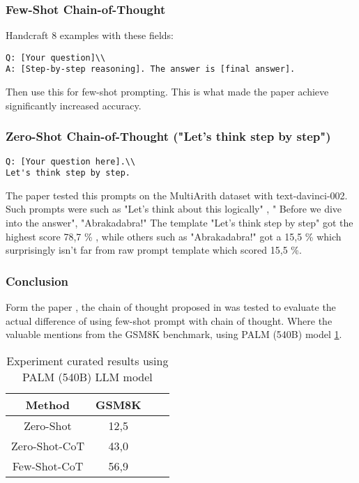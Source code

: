 \subsubsection{Few-Shot Chain-of-Thought \cite{chainofthought}}
Handcraft 8 examples with these fields:

\begin{lstlisting}[language={},basicstyle=\ttfamily\footnotesize,caption={Few-Shot Chain-of-Thought Prompt Template}]
Q: [Your question]\\
A: [Step-by-step reasoning]. The answer is [final answer].
\end{lstlisting}

Then use this for few-shot prompting. This is what made the paper achieve significantly increased accuracy.

\subsubsection{Zero-Shot Chain-of-Thought ("Let's think step by step") \cite{chainofzero}}
\begin{lstlisting}[language={},basicstyle=\ttfamily\footnotesize,caption={Zero-Shot Chain-of-Thought Prompt Template}]
Q: [Your question here].\\
Let's think step by step.
\end{lstlisting}

The paper \cite{chainofzero} tested this prompts on the MultiArith dataset with text-davinci-002. Such prompts were such as "Let's think about this logically" , " Before we dive into the answer", "Abrakadabra!"
The template "Let's think step by step" got the highest score 78,7 \% , while others such as "Abrakadabra!" got a 15,5 \% which surprisingly isn't far from raw prompt template which scored 15,5 \%.

\subsubsection{Conclusion}
Form the paper \cite{chainofzero}, the chain of thought proposed in \cite{chainofthought} was tested to evaluate the actual difference of using few-shot prompt with chain of thought.
Where the valuable mentions from the GSM8K benchmark, using PALM (540B) model \ref{tab:chainofzero}.

\begin{table}[h!]
    \centering
    \begin{tabular}{|c|c|cc}
        \hline
        Method & GSM8K\\
        \hline
        Zero-Shot & 12,5 \\
        \hline
        Zero-Shot-CoT \cite{chainofzero} & 43,0 \\
        \hline
        Few-Shot-CoT \cite{chainofthought} & 56,9 \\
        \hline
    \end{tabular}
    \caption{Experiment curated results using PALM (540B) \gls{LLM} model \cite{chainofzero}}
    \label{tab:chainofzero}
\end{table}

